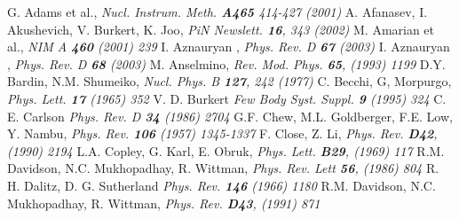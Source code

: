 
\pagestyle{fancy}
\renewcommand{\sectionmark}[1]{\markright{\bfseries \slshape \thesection\ #1}{}}
\fancyhead[R]{\rightmark}
\fancyhead[L]{\leftmark}
\fancyfoot[L]{}


\begin{singlespace}
\begin{thebibliography}{99}

      {G. Adams et al.},                                          \textit{Nucl. Instrum. Meth. {\bf A465 } 414-427 (2001)}
    {A. Afanasev, I. Akushevich, V. Burkert, K. Joo},           \textit{PiN Newslett.  {\bf 16}, 343 (2002)}
         {M. Amarian et al.},                                        \textit{NIM A {\bf 460} (2001) 239}  
      {I. Aznauryan },                                            \textit{Phys. Rev. D {\bf 67} (2003)}
      {I. Aznauryan },                                            \textit{Phys. Rev. D {\bf 68} (2003) }
    {M. Anselmino},                                             \textit{Rev. Mod. Phys. {\bf 65}, (1993) 1199}
   {D.Y. Bardin, N.M. Shumeiko},                               \textit{Nucl. Phys. B {\bf 127}, 242 (1977)} 
   {C. Becchi, G, Morpurgo},                                   \textit{Phys. Lett. {\bf 17} (1965) 352}
    {V. D. Burkert}                                             \textit{Few Body Syst. Suppl. {\bf 9} (1995) 324}
    {C. E. Carlson}                                             \textit{Phys. Rev. D {\bf 34} (1986) 2704}
       {G.F. Chew, M.L. Goldberger, F.E. Low, Y. Nambu},           \textit{Phys. Rev. {\bf 106} (1957) 1345-1337}
    {F. Close, Z. Li},                                          \textit{Phys. Rev. {\bf D42}, (1990) 2194}
    {L.A. Copley, G. Karl, E. Obruk},                           \textit{Phys. Lett. {\bf B29}, (1969) 117}
    {R.M. Davidson, N.C. Mukhopadhay, R. Wittman},              \textit{Phys. Rev. Lett {\bf 56}, (1986) 804}
     {R. H. Dalitz, D. G. Sutherland}                            \textit{Phys. Rev. {\bf 146} (1966) 1180}
    {R.M. Davidson, N.C. Mukhopadhay, R. Wittman},              \textit{Phys. Rev. {\bf D43}, (1991) 871}

\end{thebibliography}
\end{singlespace}
